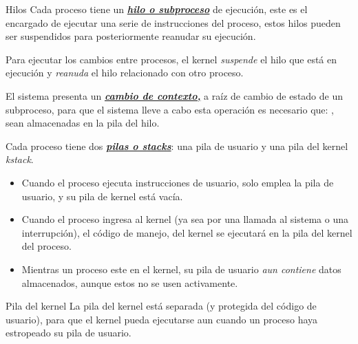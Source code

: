 \documentclass{libs/ufc_format}
\begin{document}
\begin{frame}{Hilos}
  Cada proceso tiene un \href{https://en.wikipedia.org/wiki/Thread_(computing)}{\textbf{\textit{hilo o subproceso}}} de ejecución, este es el encargado de ejecutar una serie de instrucciones del proceso, estos hilos pueden ser suspendidos para posteriormente reanudar su ejecución.

  \vspace{0.3cm}

  Para ejecutar los cambios entre procesos, el kernel \emph{suspende} el hilo que está en ejecución y \emph{reanuda} el hilo relacionado con otro proceso.

  \vspace{0.2cm}

  El sistema presenta un \href{https://en.wikipedia.org/wiki/Context_switch}{\textit{\textbf{cambio de contexto,}}} a raíz de cambio de estado de un subproceso, para que el sistema lleve a cabo esta operación es necesario que: , sean almacenadas en la pila del hilo.
\end{frame}
\begin{frame}{}
  Cada proceso tiene dos \href{https://en.wikipedia.org/wiki/Stack-based_memory_allocation}{\textit{\textbf{pilas o stacks}}}: una pila de usuario y una pila del kernel \textit{kstack}.

  \begin{itemize}
    \item Cuando el proceso ejecuta instrucciones de usuario, solo emplea la pila de usuario, y su pila de kernel está vacía.
    \item Cuando el proceso ingresa al kernel (ya sea por una llamada al sistema o una interrupción), el código de manejo, del kernel se ejecutará en la pila del kernel del proceso.
    \item Mientras un proceso este en el kernel, su pila de usuario \emph{aun contiene} datos almacenados, aunque estos no se usen activamente.
  \end{itemize}

  \begin{block}{Pila del kernel}
    La pila del kernel está separada (y protegida del código de usuario), para que el kernel pueda ejecutarse aun cuando un proceso haya estropeado su pila de usuario. \cite{xv6_book}
  \end{block}
\end{frame}
\end{document}
